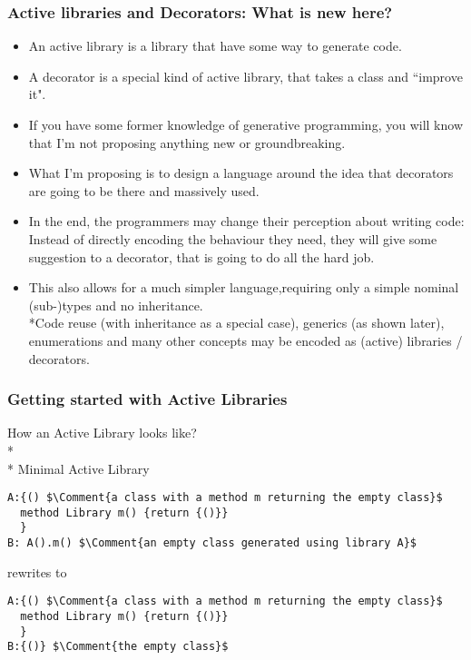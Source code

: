 \begin{frame}[fragile]
\frametitle{Active libraries and Decorators: What is new here?}
\begin{itemize}
\item An active library is a library that have some way to generate code.
\item A decorator is a special kind of active library, that takes a class and ``improve it".

\item If you have some former knowledge of generative programming, you will know that I'm not proposing anything new or groundbreaking.

\PresentationOnly\pause\item What I'm proposing is to design a language around the idea that decorators are going to \alert{be there} and massively used.

\PresentationOnly\pause\item In the end, the programmers may change their perception about writing code: Instead of directly encoding the behaviour they need, they will give some suggestion to a decorator, that is going to do all the hard job.

\PresentationOnly\pause\item This also allows for a much simpler language,requiring only a simple nominal (sub-)types and no inheritance.
\\*Code reuse (with inheritance as a special case), generics (as shown later), enumerations and many other concepts may be encoded as (active) libraries / decorators.
\end{itemize}
\end{frame}


\begin{frame}[fragile]
\frametitle{Getting started with Active Libraries}
How an Active Library looks like? 
\\*${}_{}$
\\*
Minimal Active Library

\begin{NiceCode}{59ex}{1}
\begin{lstlisting}
A:{() $\Comment{a class with a method m returning the empty class}$
  method Library m() {return {()}}
  }
B: A().m() $\Comment{an empty class generated using library A}$
\end{lstlisting}
\end{NiceCode}
rewrites to 

\begin{NiceCode}{59ex}{1}
\begin{lstlisting}
A:{() $\Comment{a class with a method m returning the empty class}$
  method Library m() {return {()}}
  }
B:{()} $\Comment{the empty class}$
\end{lstlisting}
\end{NiceCode}

\end{frame}

